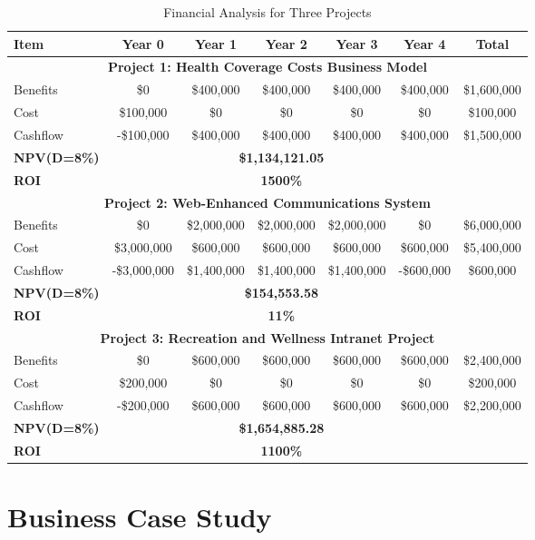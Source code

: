 \begin{table}[ht]
    \centering
    \caption{Financial Analysis for Three Projects}
    \label{tab:financial_analysis}
    \begin{tabular}{lcccccc}
    \toprule
    \textbf{Item} & \textbf{Year 0} & \textbf{Year 1} & \textbf{Year 2} & \textbf{Year 3} & \textbf{Year 4} & \textbf{Total} \\
    \midrule
    \multicolumn{7}{c}{\textbf{Project 1: Health Coverage Costs Business Model}} \\
    \midrule
    Benefits & \$0 & \$400,000 & \$400,000 & \$400,000 & \$400,000 & \$1,600,000 \\
    Cost & \$100,000 & \$0 & \$0 & \$0 & \$0 & \$100,000 \\
    Cashflow & -\$100,000 & \$400,000 & \$400,000 & \$400,000 & \$400,000 & \$1,500,000 \\
    \textbf{NPV(D=8\%)} & \multicolumn{5}{c}{\textbf{\$1,134,121.05}} \\
    \textbf{ROI} & \multicolumn{5}{c}{\textbf{1500\%}} \\
    \midrule
    \multicolumn{7}{c}{\textbf{Project 2: Web-Enhanced Communications System}} \\
    \midrule
    Benefits & \$0 & \$2,000,000 & \$2,000,000 & \$2,000,000 & \$0 & \$6,000,000 \\
    Cost & \$3,000,000 & \$600,000 & \$600,000 & \$600,000 & \$600,000 & \$5,400,000 \\
    Cashflow & -\$3,000,000 & \$1,400,000 & \$1,400,000 & \$1,400,000 & -\$600,000 & \$600,000 \\
    \textbf{NPV(D=8\%)} & \multicolumn{5}{c}{\textbf{\$154,553.58}} \\
    \textbf{ROI} & \multicolumn{5}{c}{\textbf{11\%}} \\
    \midrule
    \multicolumn{7}{c}{\textbf{Project 3: Recreation and Wellness Intranet Project}} \\
    \midrule
    Benefits & \$0 & \$600,000 & \$600,000 & \$600,000 & \$600,000 & \$2,400,000 \\
    Cost & \$200,000  & \$0 & \$0 & \$0 & \$0 & \$200,000  \\
    Cashflow & -\$200,000  & \$600,000 & \$600,000 & \$600,000 & \$600,000 & \$2,200,000 \\
    \textbf{NPV(D=8\%)} & \multicolumn{5}{c}{\textbf{\$1,654,885.28}} \\
    \textbf{ROI} & \multicolumn{5}{c}{\textbf{1100\%}} \\
    \bottomrule
    \end{tabular}
\end{table}
    

\section{Business Case Study}

